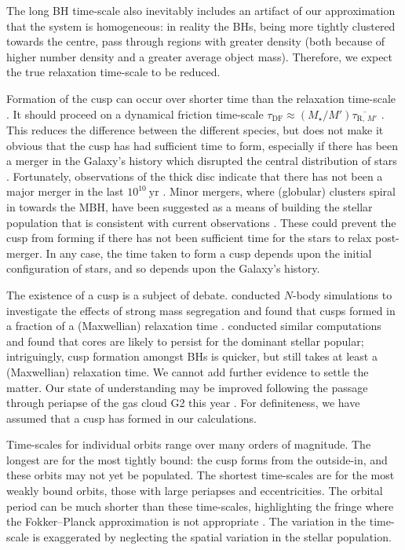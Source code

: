 \documentclass[useAMS,usedcolumn,usegraphicx,usenatbib]{mn2e}
\newcommand{\units}[1]{\ensuremath{~\mathrm{#1}}}
\newcommand{\sub}[1]{\ensuremath{_\mathrm{#1}}}
\begin{document}
\begin{onecolumn}
The long BH time-scale also inevitably includes an artifact of our approximation that the system is homogeneous: in reality the BHs, being more tightly clustered towards the centre, pass through regions with greater density (both because of higher number density and a greater average object mass). Therefore, we expect the true relaxation time-scale to be reduced. 

Formation of the cusp can occur over shorter time than the relaxation time-scale \citep{Bar-Or2012}. It should proceed on a dynamical friction time-scale $\tau\sub{DF} \approx (M_\star/M')\overline{\tau_{\mathrm{R},\,M'}}$ \citep[section 3.4]{Spitzer1987}. This reduces the difference between the different species, but does not make it obvious that the cusp has had sufficient time to form, especially if there has been a merger in the Galaxy's history which disrupted the central distribution of stars \citep{Gualandris2012}. Fortunately, observations of the thick disc indicate that there has not been a major merger in the last $10^{10}\units{yr}$ \citep{Wyse2008}. Minor mergers, where (globular) clusters spiral in towards the MBH, have been suggested as a means of building the stellar population that is consistent with current observations \citep{Antonini2011a,Antonini2013}. These could prevent the cusp from forming if there has not been sufficient time for the stars to relax post-merger. In any case, the time taken to form a cusp depends upon the initial configuration of stars, and so depends upon the Galaxy's history. 

The existence of a cusp is a subject of debate. \citet{Preto2010} conducted $N$-body simulations to investigate the effects of strong mass segregation \citep{Alexander2009, Keshet2009} and found that cusps formed in a fraction of a (Maxwellian) relaxation time \citep{Amaro-Seoane2011}. \citet{Gualandris2012} conducted similar computations and found that cores are likely to persist for the dominant stellar popular; intriguingly, cusp formation amongst BHs is quicker, but still takes at least a (Maxwellian) relaxation time. We cannot add further evidence to settle the matter. Our state of understanding may be improved following the passage through periapse of the gas cloud G2 this year \citep{Bartos2013}. For definiteness, we have assumed that a cusp has formed in our calculations.

Time-scales for individual orbits range over many orders of magnitude. The longest are for the most tightly bound: the cusp forms from the outside-in, and these orbits may not yet be populated. The shortest time-scales are for the most weakly bound orbits, those with large periapses and eccentricities. The orbital period can be much shorter than these time-scales, highlighting the fringe where the Fokker--Planck approximation is not appropriate \citep{Spitzer1972}. The variation in the time-scale is exaggerated by neglecting the spatial variation in the stellar population.


\end{onecolumn}
\end{document}
